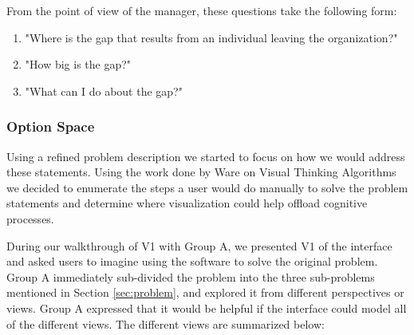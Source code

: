 \documentclass[journal]{vgtc}                %
\begin{document}
From the point of view of the manager, these questions take the following form: 

\begin{enumerate}
\item "Where is the gap that results from an individual leaving the organization?"
\item "How big is the gap?"
\item "What can I do about the gap?"
\end{enumerate}

\subsubsection{Option Space}
Using a refined problem description we started to focus on how we would address these statements.  Using the work done by Ware on Visual Thinking Algorithms~\cite[Chapter 11]{ware2012information} we decided to enumerate the steps a user would do manually to solve the problem statements and determine where visualization could help offload cognitive processes.

During our walkthrough of V1 with Group A, we presented V1 of the interface and asked users to imagine using the software to solve the original problem. Group A immediately sub-divided the problem into the three sub-problems mentioned in Section \ref{sec:problem}, and explored it from different perspectives or views. Group A expressed that it would be helpful if the interface could model all of the different views. The different views are summarized below:
\end{document}
